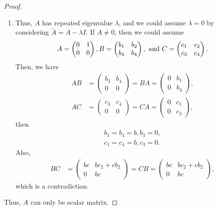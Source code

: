 \documentclass[10pt]{book}
\theoremstyle{definition}
\numberwithin{equation}{chapter}
\begin{document}
\begin{proof}
\begin{enumerate}[label=(\alph*)]
    \item Thus, $A$ has repeated eigenvalue $\lambda$, and we could assume $\lambda = 0$ by considering $\widetilde{A} = A - \lambda I$. If $A \neq 0$, then we could assume 
    \begin{align*}
        A = \begin{pmatrix}
            0 & 1 \\
            0 & 0
        \end{pmatrix}, B = \begin{pmatrix}
            b_1 & b_2 \\
            b_3 & b_4
        \end{pmatrix},\,\, {\rm and}\,\, C = \begin{pmatrix}
            c_1 & c_2 \\
            c_3 & c_4
        \end{pmatrix}.
    \end{align*}
    Then, we have
    \begin{align*}
        AB & = \begin{pmatrix}
            b_3 & b_4 \\
            0     & 0
        \end{pmatrix} = BA = \begin{pmatrix}
            0 & b_1 \\
            0 & b_3
        \end{pmatrix}, \\
        AC & = \begin{pmatrix}
            c_3 & c_4 \\
            0     & 0
        \end{pmatrix} = CA = \begin{pmatrix}
            0 & c_1 \\
            0 & c_3
        \end{pmatrix},
    \end{align*}
    then 
    \begin{align*}
        b_1 = b_4 = b, b_3 = 0, \\
        c_1 = c_4 = b, c_3 = 0.
    \end{align*}
    Also, 
    \begin{align*}
        BC & = \begin{pmatrix}
            bc & bc_2+cb_2 \\
            0     & bc
        \end{pmatrix} = CB = \begin{pmatrix}
            bc & bc_2+cb_2 \\
            0     & bc
        \end{pmatrix},
    \end{align*}
    which is a contradiction.
\end{enumerate}
Thus, $A$ can only be scalar matrix.
\end{proof}
\end{document}
